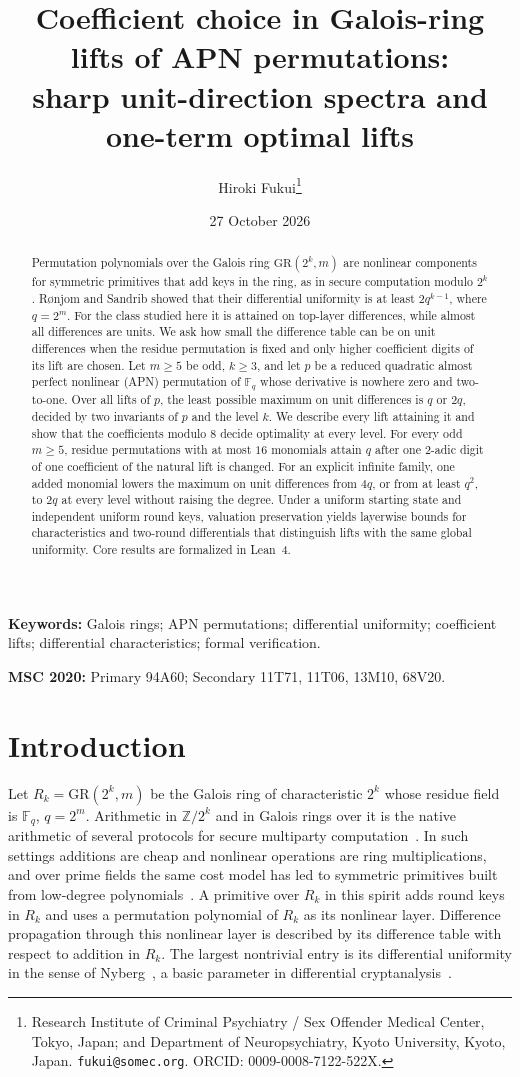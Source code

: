 \documentclass[11pt]{article}
\title{Coefficient choice in Galois-ring lifts of APN permutations:\\ sharp unit-direction spectra and one-term optimal lifts}
\author{Hiroki Fukui\thanks{Research Institute of Criminal Psychiatry / Sex Offender Medical Center, Tokyo, Japan;
and Department of Neuropsychiatry, Kyoto University, Kyoto, Japan. \texttt{fukui@somec.org}.
ORCID: 0009-0008-7122-522X.}}
\date{27 October 2026}
\theoremstyle{definition}
\theoremstyle{remark}
\newcommand{\F}{\mathbb{F}}
\newcommand{\Z}{\mathbb{Z}}
\newcommand{\GR}{\mathrm{GR}}
\begin{document}
\maketitle

\begin{abstract}
Permutation polynomials over the Galois ring $\GR(2^k,m)$ are nonlinear components for symmetric primitives
that add keys in the ring, as in secure computation modulo $2^k$. Rønjom and Sandrib showed that
their differential uniformity is at least $2q^{k-1}$, where $q=2^m$. For the class studied here it is attained on top-layer differences, while almost all differences are units. We ask how small the difference table can be on unit differences
when the residue permutation is fixed and only higher coefficient digits of its lift are chosen. Let $m\ge5$ be
odd, $k\ge3$, and let $p$ be a reduced quadratic almost perfect nonlinear (APN) permutation of $\F_q$ whose derivative
is nowhere zero and two-to-one. Over all lifts of $p$, the least possible maximum on unit differences is $q$ or $2q$,
decided by two invariants of $p$ and the level $k$. We describe every lift attaining it and show that the coefficients
modulo $8$ decide optimality at every level. For every odd $m\ge5$, residue permutations with at most $16$ monomials
attain $q$ after one $2$-adic digit of one coefficient of the natural lift is changed. For an explicit infinite family,
one added monomial lowers the maximum on unit differences from $4q$, or from at least $q^2$, to $2q$ at every level
without raising the degree. Under a uniform starting state and independent uniform round keys, valuation preservation yields layerwise bounds
for characteristics and two-round differentials that distinguish lifts with the same global uniformity. Core results are formalized in Lean~4.
\end{abstract}

\noindent\textbf{Keywords:} Galois rings; APN permutations; differential uniformity; coefficient lifts;
differential characteristics; formal verification.

\noindent\textbf{MSC 2020:} Primary 94A60; Secondary 11T71, 11T06, 13M10, 68V20.

\section{Introduction}\label{sec:intro}

Let $R_k=\GR(2^k,m)$ be the Galois ring of characteristic $2^k$ whose residue field is $\F_q$, $q=2^m$. Arithmetic in
$\Z/2^k$ and in Galois rings over it is the native arithmetic of several protocols for secure multiparty
computation~\cite{SPDZ2k,ACDEY}. In such settings additions are cheap and nonlinear operations are ring
multiplications, and over prime fields the same cost model has led to symmetric primitives built from low-degree
polynomials~\cite{MiMC}. A primitive over $R_k$ in this spirit adds round keys in $R_k$ and uses a permutation
polynomial of $R_k$ as its nonlinear layer. Difference propagation through this nonlinear layer is described by its difference table with respect to addition in
$R_k$. The largest nontrivial entry is its differential uniformity in the sense of Nyberg~\cite{Nyberg}, a basic
parameter in differential cryptanalysis~\cite{BiSh}.
\end{document}
